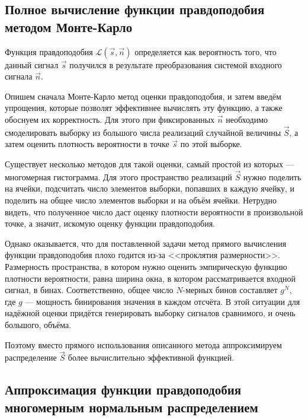 \subsection{Полное вычисление функции правдоподобия методом Монте-Карло}

\label{sec:naive-monte-carlo-likelihood}

Функция правдоподобия $\mathcal{L}(\vec{s}, \vec{n})$ определяется как вероятность того, что данный сигнал $\vec{s}$ получился в результате преобразования системой входного сигнала $\vec{n}$.

Опишем сначала Монте-Карло метод оценки правдоподобия, и затем введём упрощения, которые позволят эффективнее вычислять эту функцию, а также обоснуем их корректность. Для этого при фиксированных $\vec{n}$ необходимо смоделировать выборку из большого числа реализаций случайной величины $\vec{S}$, а затем оценить плотность вероятности в точке $\vec{s}$ по этой выборке.

Существует несколько методов для такой оценки, самый простой из которых --- многомерная гистограмма. Для этого пространство реализаций $\vec{S}$ нужно поделить на ячейки, подсчитать число элементов выборки, попавших в каждую ячейку, и поделить на общее число элементов выборки и на объём ячейки. Нетрудно видеть, что полученное число даст оценку плотности вероятности в произвольной точке, а значит, искомую оценку функции правдоподобия.

Однако оказывается, что для поставленной задачи метод прямого вычисления функции правдоподобия плохо годится из-за <<проклятия размерности>>. Размерность пространства, в котором нужно оценить эмпирическую функцию плотности вероятности, равна ширина окна, в котором рассматривается входной сигнал, в бинах. Соответственно, общее число $N$-мерных бинов составляет $g^{N}$, где $g$ --- мощность бинирования значения в каждом отсчёта. В этой ситуации для надёжной оценки придётся генерировать выборку сигналов сравнимого, и очень большого, объёма.

Поэтому вместо прямого использования описанного метода аппроксимируем распределение $\vec{S}$ более вычислительно эффективной функцией.

\subsection{Аппроксимация функции правдоподобия многомерным нормальным распределением}

\label{sec:likelihood-as-multivar-normal}

